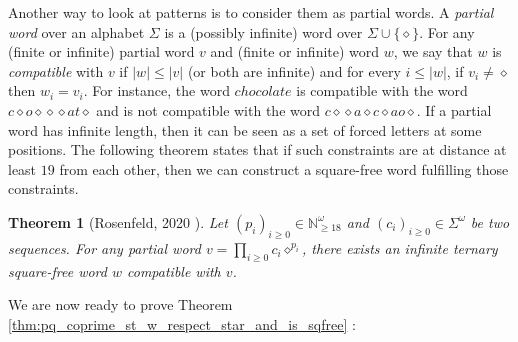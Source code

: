 \documentclass[12pt]{article}
\newtheorem{theorem}{Theorem}
\theoremstyle{definition}
\begin{document}
Another way to look at patterns is to consider them as partial words.
A \emph{partial word} over an alphabet $\Sigma$ is a (possibly infinite) word over $\Sigma \cup \{\diamond\}$. For any (finite or infinite) partial word $v$ and (finite or infinite) word $w$, we say that $w$ is \emph{compatible} with $v$ if $|w| \le |v|$ (or both are infinite) and for every $i \le |w|$, if $v_i \ne \diamond $ then $w_i = v_i$. For instance, the word $chocolate$ is compatible with the word $c\diamond o\diamond\diamond\diamond at\diamond$ and is not compatible with the word $c\diamond\diamond a\diamond c\diamond ao\diamond$. If a partial word has infinite length, then it can be seen as a set of forced letters at some positions. The following theorem states that if such constraints are at distance at least $19$ from each other, then we can construct a square-free word fulfilling those constraints.

\begin{theorem}[Rosenfeld, 2020 \cite{rosenfeld2020far}]\label{thm:borne_19_square_free_from_forced_letters}
    Let $(p_i)_{i \ge 0} \in \mathbb{N}_{\ge 18}^\omega$
    and $(c_i)_{i \ge 0} \in \Sigma^\omega$ be two sequences. 
    For any partial word $v = \prod\limits_{i\ge 0}c_i\diamond^{p_i}$, there exists an infinite ternary square-free word $w$ compatible with $v$.  
\end{theorem}

We are now ready to prove Theorem \ref{thm:pq_coprime_st_w_respect_star_and_is_sqfree} :
\end{document}
